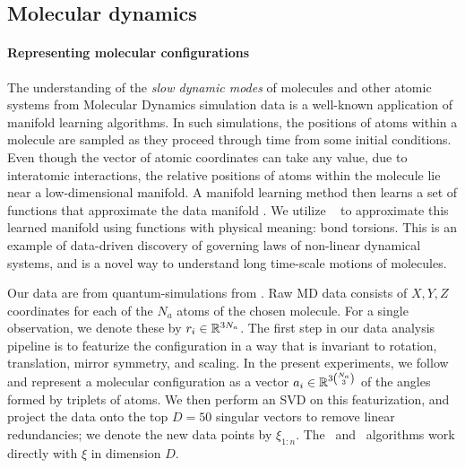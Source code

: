\subsection{Molecular dynamics}{\label{sec:md}

\paragraph{Representing molecular configurations}

The understanding of the {\em slow dynamic modes} of molecules and other atomic systems from Molecular Dynamics simulation data is a well-known application of manifold learning algorithms. In such simulations, the positions of atoms within a molecule are sampled as they proceed through time from some initial conditions. Even though the vector of atomic coordinates can take any value, due to interatomic interactions, the relative positions of atoms within the molecule lie near a low-dimensional manifold. A manifold learning method then learns a set of functions that approximate the data manifold \citet{ChenMcqueenKoelleMChmielaTkatchenko:mlcules-dum19}. We utilize \ouralg~ to approximate this learned manifold using functions with physical meaning: bond torsions. This is an example of data-driven discovery of governing laws of non-linear dynamical systems, and is a novel way to understand long time-scale motions of molecules.

Our data are from quantum-simulations from \citet{chmielaTkaSauceSchuPMull:force-fields17}. Raw MD data consists of $X,Y,Z$ coordinates for each of the $N_a$ atoms of the chosen molecule. For a single observation, we denote these by $r_i \in{\mathbb R}^{3N_a}$. The first step in our data  analysis pipeline is to featurize the configuration in a way that is invariant to rotation, translation, mirror symmetry, and scaling. In the present experiments, we follow \citet{ChenMcqueenKoelleMChmielaTkatchenko:mlcules-dum19} and represent a molecular configuration as a vector $a_i \in{\mathbb R}^{3 {N_a \choose 3}}$ of the angles formed by triplets of atoms. We then perform an SVD on this featurization, and project the data onto the top $D = 50$ singular vectors to remove linear redundancies; we denote the new data points by $\xi_{1:n}$. The \embedalg~and \tppalg~algorithms work directly with $\xi$ in dimension $D$.


}
